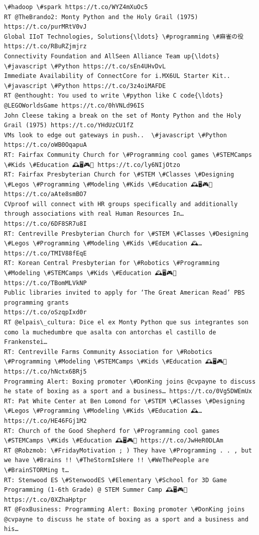 \documentclass[11pt]{article}
\begin{document}
\begin{Verbatim}[commandchars=\\\{\}]
\#hadoop \#spark https://t.co/WYZ4mXuOc5
RT @TheBrando2: Monty Python and the Holy Grail (1975) https://t.co/purMRtV0vJ
Global IIoT Technologies, Solutions{\ldots} \#programming \#麻雀の役 https://t.co/RBuRZjmjrz
Connectivity Foundation and AllSeen Alliance Team up{\ldots} \#javascript \#Python https://t.co/sEn4UHvDvL
Immediate Availability of ConnectCore for i.MX6UL Starter Kit..  \#javascript \#Python https://t.co/3z4oiMAFDE
RT @enthought: You used to write \#python like C code{\ldots} @LEGOWorldsGame https://t.co/0hVNLd96IS
John Cleese taking a break on the set of Monty Python and the Holy Grail (1975) https://t.co/YHdUzCU1fZ
VMs look to edge out gateways in push..  \#javascript \#Python https://t.co/oWB0OqapuA
RT: Fairfax Community Church for \#Programming cool games \#STEMCamps \#Kids \#Education 🕰️🖥️🎮💎 https://t.co/ly6NIjOtzo
RT: Fairfax Presbyterian Church for \#STEM \#Classes \#Designing \#Legos \#Programming \#Modeling \#Kids \#Education 🕰️🖥️🎮💎 https://t.co/aAte8smBO7
CVproof will connect with HR groups specifically and additionally through associations with real Human Resources In… https://t.co/6DF8SR7u8I
RT: Centreville Presbyterian Church for \#STEM \#Classes \#Designing \#Legos \#Programming \#Modeling \#Kids \#Education 🕰️… https://t.co/TMIV88fEqE
RT: Korean Central Presbyterian for \#Robotics \#Programming \#Modeling \#STEMCamps \#Kids \#Education 🕰️🖥️🎮💎 https://t.co/TBomMLVkNP
Public libraries invited to apply for ‘The Great American Read’ PBS programming grants
https://t.co/oSzqpIxd0r
RT @elpais\_cultura: Dice el ex Monty Python que sus integrantes son como la muchedumbre que asalta con antorchas el castillo de Frankenstei…
RT: Centreville Farms Community Association for \#Robotics \#Programming \#Modeling \#STEMCamps \#Kids \#Education 🕰️🖥️🎮💎 https://t.co/hNctx6BRj5
Programming Alert: Boxing promoter \#DonKing joins @cvpayne to discuss he state of boxing as a sport and a business… https://t.co/0Vg5DWEmUx
RT: Pat White Center at Ben Lomond for \#STEM \#Classes \#Designing \#Legos \#Programming \#Modeling \#Kids \#Education 🕰️… https://t.co/HE46FGj1M2
RT: Church of the Good Shepherd for \#Programming cool games \#STEMCamps \#Kids \#Education 🕰️🖥️🎮💎 https://t.co/JwHeR0DLAm
RT @Robzmob: \#FridayMotivation ; ) They have \#Programming . . , but we have \#Brains !! \#TheStormIsHere !! \#WeThePeople are \#BrainSTORMing t…
RT: Stenwood ES \#StenwoodES \#Elementary \#School for 3D Game Programming (1-6th Grade) @ STEM Summer Camp 🕰️🖥️🎮💎 https://t.co/0XZhaHptpr
RT @FoxBusiness: Programming Alert: Boxing promoter \#DonKing joins @cvpayne to discuss he state of boxing as a sport and a business and his…

\end{Verbatim}
\end{document}
